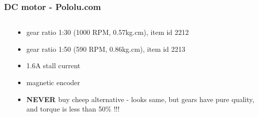 \documentclass{beamer}
\begin{document}
\begin{frame}
  
  \frametitle{\bf DC motor - Pololu.com}

  \begin{columns}

    \begin{column}{0.5\textwidth}
    \end{column}

    \begin{column}{0.5\textwidth}
      \begin{itemize}
        \item gear ratio 1:30 (1000 RPM, 0.57kg.cm), item id 2212
        \item gear ratio 1:50 (590 RPM,  0.86kg.cm), item id 2213
        \item 1.6A stall current
        \item magnetic encoder
        \item {\color{red} \bf{ NEVER }} buy cheep alternative 
          - looks same, but gears have pure quality, and torque is less than 50\% !!! 
      \end{itemize}
    \end{column}

  \end{columns}
  
\end{frame}
\end{document}
